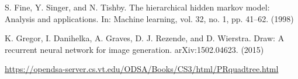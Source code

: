 \begin{thebibliography}{9}
 S. Fine, Y. Singer, and N. Tishby. The hierarchical hidden markov model: Analysis and applications. In: Machine
learning, vol. 32, no. 1, pp. 41–62. (1998)

 K. Gregor, I. Danihelka, A. Graves, D. J. Rezende, and D. Wierstra. Draw: A recurrent neural network for image generation. arXiv:1502.04623. (2015)

\href{https://opendsa-server.cs.vt.edu/ODSA/Books/CS3/html/PRquadtree.html}{https://opendsa-server.cs.vt.edu/ODSA/Books/CS3/html/PRquadtree.html}


\end{thebibliography}